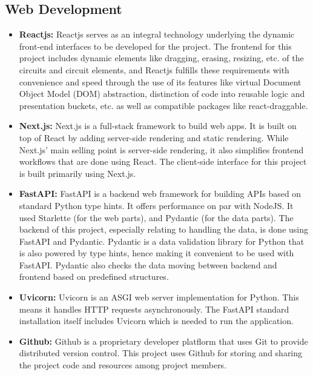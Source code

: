 \subsection{Web Development}

\begin{itemize}
    \item \textbf{Reactjs:} Reactjs serves as an integral technology underlying the dynamic front-end interfaces to be developed for the project. The frontend for this project includes dynamic elements like dragging, erasing, resizing, etc. of the circuits and circuit elements, and Reactjs fulfills these requirements with convenience and speed through the use of its features like virtual Document Object Model (DOM) abstraction, distinction of code into reusable logic and presentation buckets, etc. as well as compatible packages like react-draggable.
    
    \item \textbf{Next.js:} Next.js is a full-stack framework to build web apps. It is built on top of React by adding server-side rendering and static rendering. While Next.js' main selling point is server-side rendering, it also simplifies frontend workflows that are done using React. The client-side interface for this project is built primarily using Next.js.
    
    \item \textbf{FastAPI:} FastAPI is a backend web framework for building APIs based on standard Python type hints. It offers performance on par with NodeJS. It used Starlette (for the web parts), and Pydantic (for the data parts). The backend of this project, especially relating to handling the data, is done using FastAPI and Pydantic. Pydantic is a data validation library for Python that is also powered by type hints, hence making it convenient to be used with FastAPI. Pydantic also checks the data moving between backend and frontend based on predefined structures.
    
    \item \textbf{Uvicorn:} Uvicorn is an ASGI web server implementation for Python. This means it handles HTTP requests asynchronously. The FastAPI standard installation itself includes Uvicorn which is needed to run the application.
    
    \item \textbf{Github:} Github is a proprietary developer platflorm that uses Git to provide distributed version control. This project uses Github for storing and sharing the project code and resources among project members.
\end{itemize}

